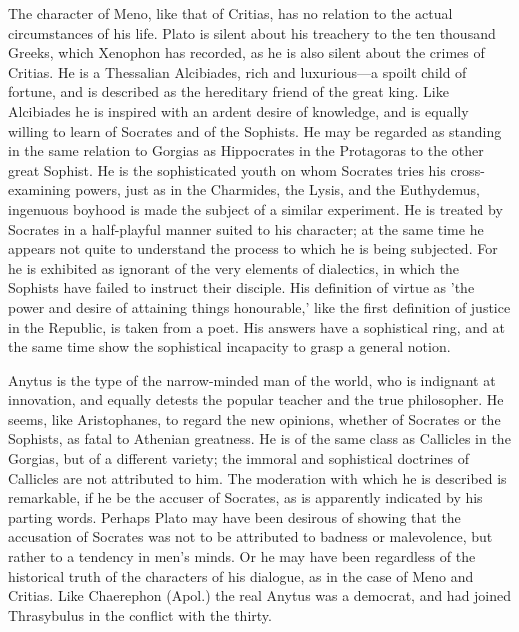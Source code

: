 \documentclass[11pt,letter]{article}
\begin{document}
\par  The character of Meno, like that of Critias, has no relation to the actual circumstances of his life. Plato is silent about his treachery to the ten thousand Greeks, which Xenophon has recorded, as he is also silent about the crimes of Critias. He is a Thessalian Alcibiades, rich and luxurious—a spoilt child of fortune, and is described as the hereditary friend of the great king. Like Alcibiades he is inspired with an ardent desire of knowledge, and is equally willing to learn of Socrates and of the Sophists. He may be regarded as standing in the same relation to Gorgias as Hippocrates in the Protagoras to the other great Sophist. He is the sophisticated youth on whom Socrates tries his cross-examining powers, just as in the Charmides, the Lysis, and the Euthydemus, ingenuous boyhood is made the subject of a similar experiment. He is treated by Socrates in a half-playful manner suited to his character; at the same time he appears not quite to understand the process to which he is being subjected. For he is exhibited as ignorant of the very elements of dialectics, in which the Sophists have failed to instruct their disciple. His definition of virtue as 'the power and desire of attaining things honourable,' like the first definition of justice in the Republic, is taken from a poet. His answers have a sophistical ring, and at the same time show the sophistical incapacity to grasp a general notion.

\par  Anytus is the type of the narrow-minded man of the world, who is indignant at innovation, and equally detests the popular teacher and the true philosopher. He seems, like Aristophanes, to regard the new opinions, whether of Socrates or the Sophists, as fatal to Athenian greatness. He is of the same class as Callicles in the Gorgias, but of a different variety; the immoral and sophistical doctrines of Callicles are not attributed to him. The moderation with which he is described is remarkable, if he be the accuser of Socrates, as is apparently indicated by his parting words. Perhaps Plato may have been desirous of showing that the accusation of Socrates was not to be attributed to badness or malevolence, but rather to a tendency in men's minds. Or he may have been regardless of the historical truth of the characters of his dialogue, as in the case of Meno and Critias. Like Chaerephon (Apol.) the real Anytus was a democrat, and had joined Thrasybulus in the conflict with the thirty.
\end{document}
